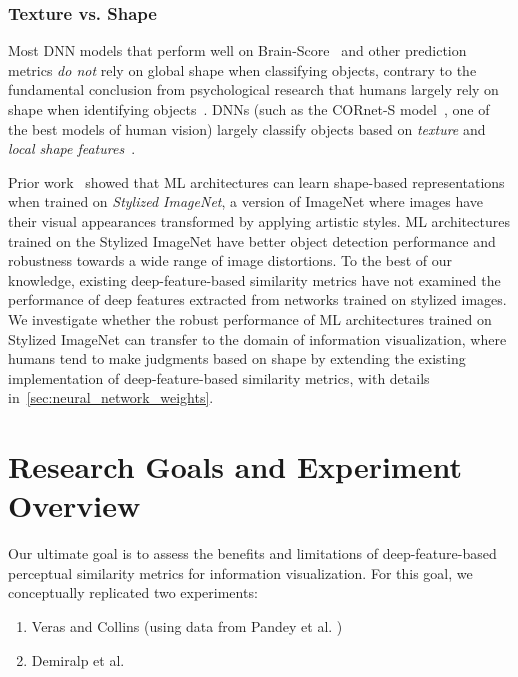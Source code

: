 \documentclass[sigconf]{acmart}
\begin{document}
\subsubsection{Texture vs. Shape}

Most DNN models that perform well on Brain-Score~\cite{schrimpf2018brain} and other prediction metrics \textit{do not} rely on global shape when classifying objects, contrary to the fundamental conclusion from psychological research that humans largely rely on shape when identifying objects~\cite{bowers2023deep}. DNNs (such as the CORnet-S model~\cite{kubilius2018cornet}, one of the best models of human vision) largely classify objects based on \textit{texture} and \textit{local shape features}~\cite{wichmann2023deep}. 

Prior work~\cite{geirhos2018imagenet} showed that ML architectures can learn shape-based representations when trained on \textit{Stylized ImageNet}, a version of ImageNet where images have their visual appearances transformed by applying artistic styles. ML architectures trained on the Stylized ImageNet have better object detection performance and robustness towards a wide range of image distortions. To the best of our knowledge, existing deep-feature-based similarity metrics have not examined the performance of deep features extracted from networks trained on stylized images. We investigate whether the robust performance of ML architectures trained on Stylized ImageNet can transfer to the domain of information visualization, where humans tend to make judgments based on shape by extending the existing implementation of deep-feature-based similarity metrics, with details in~\cref{sec:neural_network_weights}. 

\section{Research Goals and Experiment Overview}
\label{sec:exp-overview}

Our ultimate goal is to assess the benefits and limitations of deep-feature-based perceptual similarity metrics for information visualization. For this goal, we conceptually replicated two experiments: 

\begin{enumerate}
    \item Veras and Collins \cite{veras2019discriminability} (using data from Pandey et al. \cite{pandey2016towards}) 
    \item Demiralp et al. \cite{demiralp2014learning}
\end{enumerate}
\end{document}
